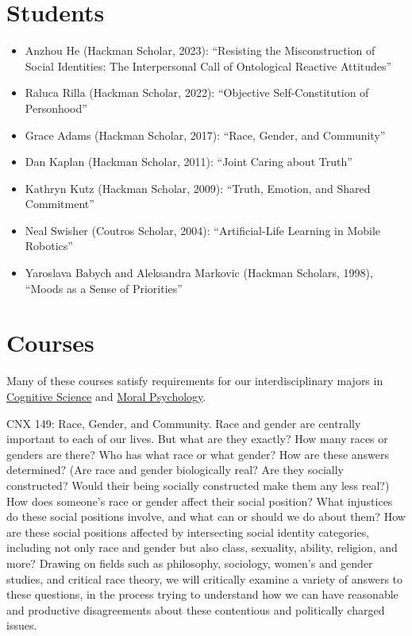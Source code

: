 \documentclass[%
  11pt,%
]{article}
\begin{document}
\section{Students}

\begin{itemize}

  \item Anzhou He (Hackman Scholar, 2023): \enquote{Resisting the Misconstruction of Social Identities: The Interpersonal Call of Ontological Reactive Attitudes}
  \item Raluca Rilla (Hackman Scholar, 2022): \enquote{Objective Self-Constitution of Personhood}
  \item Grace Adams (Hackman Scholar, 2017): \enquote{Race, Gender, and Community}
  \item Dan Kaplan (Hackman Scholar, 2011): \enquote{Joint Caring about Truth}
  \item Kathryn Kutz (Hackman Scholar, 2009): \enquote{Truth, Emotion, and Shared Commitment}
  \item Neal Swisher (Coutros Scholar, 2004): \enquote{Artificial-Life Learning in Mobile Robotics}
  \item Yaroslava Babych and Aleksandra Markovic (Hackman Scholars, 1998), \enquote{Moods as a Sense of Priorities}

\end{itemize}

\section{Courses}

Many of these courses satisfy requirements for our interdisciplinary majors in \href{https://www.fandm.edu/fields-of-study/cognitive-science/index.html}{Cognitive Science} and \href{https://www.fandm.edu/fields-of-study/moral-psychology/index.html}{Moral Psychology}.
\medskip{}

\begin{htmlcourse}{CNX 149: Race, Gender, and Community.}
  Race and gender are centrally important to each of our lives. But what are they exactly? How many races or genders are there? Who has what race or what gender? How are these answers determined? (Are race and gender biologically real? Are they socially constructed? Would their being socially constructed make them any less real?) How does someone's race or gender affect their social position? What injustices do these social positions involve, and what can or should we do about them? How are these social positions affected by intersecting social identity categories, including not only race and gender but also class, sexuality, ability, religion, and more? Drawing on fields such as philosophy, sociology, women's and gender studies, and critical race theory, we will critically examine a variety of answers to these questions, in the process trying to understand how we can have reasonable and productive disagreements about these contentious and politically charged issues.
\end{htmlcourse}
\end{document}
